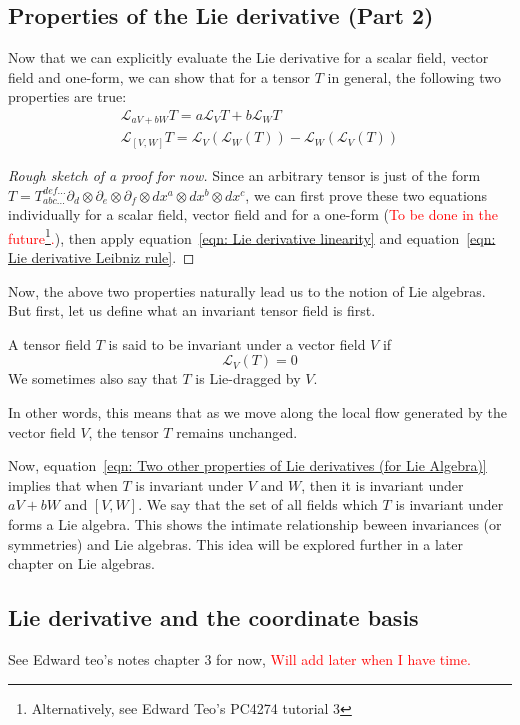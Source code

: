     \subsection{Properties of the Lie derivative (Part 2)}
      Now that we can explicitly evaluate the Lie derivative for a scalar
      field, vector field and one-form, we can show that for a tensor $T$ in
      general, the following two properties are true:
      \begin{subequations}
        \label{eqn: Two other properties of Lie derivatives (for Lie Algebra)}
        \begin{gather}
          \mathcal{L}_{a V + b W}T = a\mathcal{L}_V T + b\mathcal{L}_W T \\
          \mathcal{L}_{[V,W]}T = \mathcal{L}_V\left(\mathcal{L}_W(T)\right)
          -\mathcal{L}_W\left(\mathcal{L}_V(T) \right)
        \end{gather}
    \end{subequations}
      \begin{proof}[Rough sketch of a proof for now]
        Since an arbitrary tensor is just of the form $T =
        T_{abc...}^{def...} \partial_d \otimes \partial_e \otimes \partial_f
        \otimes dx^a \otimes dx^b \otimes dx^c$, we can first prove these two
        equations individually for a scalar field, vector field and for a
        one-form (\textcolor{red}{To be done in the
        future\footnote{Alternatively, see Edward Teo's PC4274 tutorial
        3}.}), then apply equation~\ref{eqn: Lie derivative linearity} and
        equation~\ref{eqn: Lie derivative Leibniz rule}.
      \end{proof}
      Now, the above two properties naturally lead us to the notion of Lie
      algebras. But first, let us define what an invariant tensor field is
      first.
      \begin{definition}
        A tensor field $T$ is said to be invariant under a vector field $V$ if
        \[\mathcal{L}_V(T) = 0\]
        We sometimes also say that $T$ is Lie-dragged by $V$.
      \end{definition}
      \begin{remark}
        In other words, this means that as we move along the local flow
        generated by the vector field $V$, the tensor $T$ remains unchanged.
      \end{remark}
      Now, equation~\ref{eqn: Two other properties of Lie derivatives (for
      Lie Algebra)} implies that when $T$ is invariant under $V$ and $W$,
      then it is invariant under $aV+bW$ and $[V,W]$. We say that the set of
      all fields which $T$ is invariant under forms a Lie algebra. This shows
      the intimate relationship beween invariances (or symmetries) and Lie
      algebras. This idea will be explored further in a later chapter on Lie
      algebras.
    \subsection{Lie derivative and the coordinate basis}
      See Edward teo's notes chapter 3 for now, \textcolor{red}{Will add
      later when I have time.}